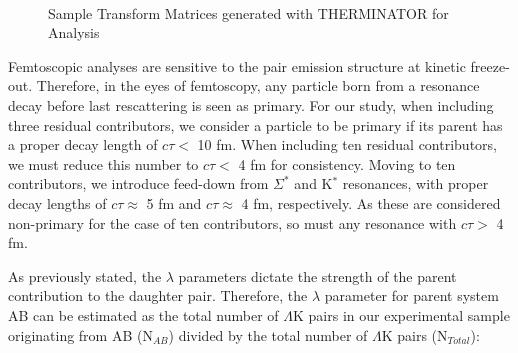 \documentclass[/home/jesse/Analysis/FemtoAnalysis/AnalysisNotes/AnalysisNoteJBuxton.tex]{subfiles}
\begin{document}
\begin{figure}[h!]
  \centering
   \\
  \caption[Sample Transform Matrices for \ALamKchP Analysis]{Sample Transform Matrices generated with THERMINATOR for \ALamKchP Analysis}
  \label{fig:TransformMatricesALamKchP}
\end{figure}


Femtoscopic analyses are sensitive to the pair emission structure at kinetic freeze-out.
Therefore, in the eyes of femtoscopy, any particle born from a resonance decay before last rescattering is seen as primary.
For our study, when including three residual contributors, we consider a particle to be primary if its parent has a proper decay length of $c\tau <$ 10 fm.
When including ten residual contributors, we must reduce this number to $c\tau <$ 4 fm for consistency.
Moving to ten contributors, we introduce feed-down from $\Sigma^{*}$ and K$^{*}$ resonances, with proper decay lengths of $c\tau \approx$ 5 fm and $c\tau \approx$ 4 fm, respectively.
As these are considered non-primary for the case of ten contributors, so must any resonance with $c\tau >$ 4 fm.

 
As previously stated, the $\lambda$ parameters dictate the strength of the parent contribution to the daughter pair.  
Therefore, the $\lambda$ parameter for parent system AB can be estimated as the total number of $\Lambda$K pairs in our experimental sample originating from AB (N$_{AB}$) divided by the total number of $\Lambda$K pairs (N$_{Total}$):
\end{document}
